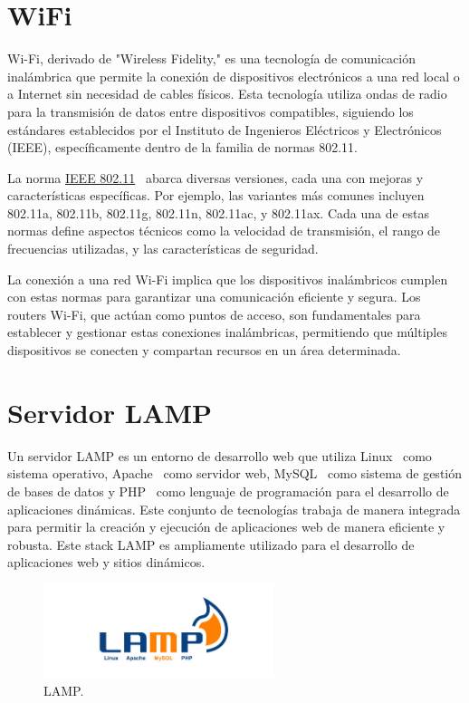 \section{WiFi}\label{concepto:WIFI}
Wi-Fi, derivado de "Wireless Fidelity," es una tecnología de comunicación inalámbrica que permite la conexión de dispositivos electrónicos a una red local o a Internet sin necesidad de cables físicos. Esta tecnología utiliza ondas de radio para la transmisión de datos entre dispositivos compatibles, siguiendo los estándares establecidos por el Instituto de Ingenieros Eléctricos y Electrónicos (IEEE), específicamente dentro de la familia de normas 802.11.

La norma \underline{IEEE 802.11}~\cite{manual:IEEE802.11} abarca diversas versiones, cada una con mejoras y características específicas. Por ejemplo, las variantes más comunes incluyen 802.11a, 802.11b, 802.11g, 802.11n, 802.11ac, y 802.11ax. Cada una de estas normas define aspectos técnicos como la velocidad de transmisión, el rango de frecuencias utilizadas, y las características de seguridad.

La conexión a una red Wi-Fi implica que los dispositivos inalámbricos cumplen con estas normas para garantizar una comunicación eficiente y segura. Los routers Wi-Fi, que actúan como puntos de acceso, son fundamentales para establecer y gestionar estas conexiones inalámbricas, permitiendo que múltiples dispositivos se conecten y compartan recursos en un área determinada.

\section{Servidor LAMP}\label{concepto:LAMP}
Un servidor LAMP es un entorno de desarrollo web que utiliza Linux~\cite{misc:Linux} como sistema operativo, Apache~\cite{misc:Apache} como servidor web, MySQL~\cite{misc:Mysql} como sistema de gestión de bases de datos y PHP~\cite{misc:PHP} como lenguaje de programación para el desarrollo de aplicaciones dinámicas. Este conjunto de tecnologías trabaja de manera integrada para permitir la creación y ejecución de aplicaciones web de manera eficiente y robusta.
Este stack LAMP es ampliamente utilizado para el desarrollo de aplicaciones web y sitios dinámicos.

\begin{figure}[h]
    \centering
    \includegraphics[width=0.6\textwidth]{img/herramientas/lamp.png}
    \caption{LAMP.}
\end{figure}

